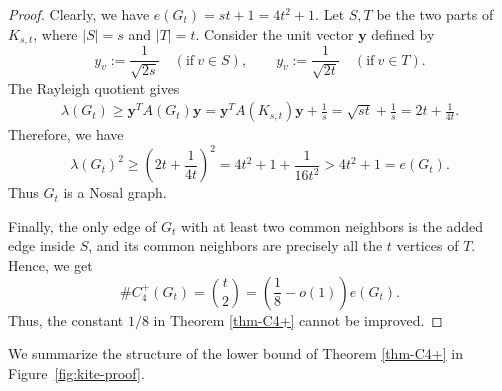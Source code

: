 \documentclass[11pt,a4paper]{article}
\theoremstyle{definition}
\theoremstyle{plain}
\renewcommand{\ge}{\geqslant}
\begin{document}
\begin{proof}
Clearly, we have 
$      e(G_t)=st+1=4t^2+1.$ 
Let \(S,T\) be the two parts of \(K_{s,t}\), where \(|S|=s\) and \(|T|=t\).
Consider the unit vector \( \bm{y}\) defined by
\[
        y_v:=\frac{1}{\sqrt{2s}}\quad(\text{if}~v\in S),
        \qquad
        y_v:=\frac{1}{\sqrt{2t}}\quad(\text{if}~v\in T).
\]
The Rayleigh quotient gives
\[
\begin{aligned}
        \lambda(G_t)
        \ge
        \bm{y}^T A(G_t)\bm{y}                               =
        \bm{y}^T A(K_{s,t}) \bm{y}+\frac1s                   =
        \sqrt{st}+\frac1s
        =
        2t+\frac{1}{4t}.
\end{aligned}
\]
Therefore, we have 
\[
        \lambda(G_t)^2
        \ge
        \left(2t+\frac{1}{4t}\right)^2
        =
        4t^2+1+\frac{1}{16t^2}
        >
        4t^2+1
        =
        e(G_t).
\]
Thus \(G_t\) is a Nosal graph.

Finally, the only edge of \(G_t\) with at least two common neighbors is the
added edge inside \(S\), and its common neighbors are precisely all the \(t\)
vertices of \(T\).  Hence, we get 
\[
        \texttt{\#}{C_4^+}(G_t)
        =
        {t\choose2}
        =
        \left(\frac18 - o(1)\right)e(G_t).
\]
Thus, the constant \(1/8\) in Theorem \ref{thm-C4+} cannot be improved. 
\end{proof}

 
We summarize the structure of the lower bound of Theorem \ref{thm-C4+}  in Figure~\ref{fig:kite-proof}.
\end{document}
